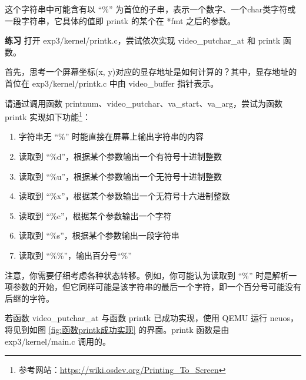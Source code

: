 这个字符串中可能含有以 “\%” 为首位的子串，表示一个数字、一个char类字符或一段字符串，它具体的值即 printk 的某个在 *fmt 之后的参数。

\begin{mdframed}[hidealllines=true,backgroundcolor=gray!20]
\textbf{练习 } 打开 exp3/kernel/printk.c，尝试依次实现 video\_putchar\_at 和 printk 函数。

首先，思考一个屏幕坐标(x, y)对应的显存地址是如何计算的？其中，显存地址的首位在 exp3/kernel/printk.c 中由 video\_buffer 指针表示。

请通过调用函数 printnum、video\_putchar、va\_start、va\_arg，尝试为函数 printk 实现如下功能\footnote{参考网站：\url{https://wiki.osdev.org/Printing_To_Screen}}：

\begin{enumerate}
    \item 字符串无 “\%” 时能直接在屏幕上输出字符串的内容
    \item 读取到 “\%d”，根据某个参数输出一个有符号十进制整数
    \item 读取到 “\%u”，根据某个参数输出一个无符号十进制整数
    \item 读取到 “\%x”，根据某个参数输出一个无符号十六进制整数
    \item 读取到 “\%c”，根据某个参数输出一个字符
    \item 读取到 “\%s”，根据某个参数输出一段字符串
    \item 读取到 “\%\%”，输出百分号“\%”
\end{enumerate}

注意，你需要仔细考虑各种状态转移。例如，你可能认为读取到 “\%” 时是解析一项参数的开始，但它同样可能是该字符串的最后一个字符，即一个百分号可能没有后继的字符。

若函数 video\_putchar\_at 与函数 printk 已成功实现，使用 QEMU 运行 neuos，将见到如图 \ref{fig:函数printk成功实现} 的界面。printk 函数是由 exp3/kernel/main.c 调用的。

\end{mdframed}

